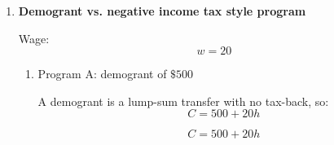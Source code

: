 \documentclass[12pt]{article}
\begin{document}
\begin{enumerate}
\begin{enumerate}[label=(\alph*)]
    \item Disposable income while benefits are positive:

    The standard formula is:
    \[
    C=G+(1-t)wh
    \]
    Substitute:
    \[
    C=700+(1-0.40)(25)h
    \]
    \[
    C=700+0.60(25)h
    \]
    \[
    \boxed{C=700+15h}
    \]

    \item Effective net wage:

    The effective net wage is:
    \[
    (1-t)w=0.60(25)=15
    \]

    \[
    \boxed{\$15 \text{ per hour}}
    \]

    \item Break-even level of earnings:

    Benefits fall to zero when:
    \[
    G=twh
    \]
    or equivalently when gross earnings satisfy:
    \[
    wh=\frac{G}{t}
    \]
    So:
    \[
    wh=\frac{700}{0.40}=1750
    \]

    \[
    \boxed{\$1750}
    \]

    \item Corresponding hours of work:

    Since \(w=25\),
    \[
    25h=1750
    \]
    \[
    h=70
    \]

    \[
    \boxed{70 \text{ hours}}
    \]

    \item Effect of higher benefit reduction rate:

    A higher tax-back rate lowers the effective net wage:
    \[
    (1-t)w
    \]
    so workers keep less of each extra dollar earned. This weakens the incentive to work additional hours and may reduce labour supply.
\end{enumerate}


\item \textbf{Demogrant vs. negative income tax style program}

Wage:
\[
w=20
\]

\begin{enumerate}[label=(\alph*)]
    \item Program A: demogrant of \(\$500\)

    A demogrant is a lump-sum transfer with no tax-back, so:
    \[
    C=500+20h
    \]

    \[
    \boxed{C=500+20h}
    \]


\end{enumerate}
\end{enumerate}
\end{document}
